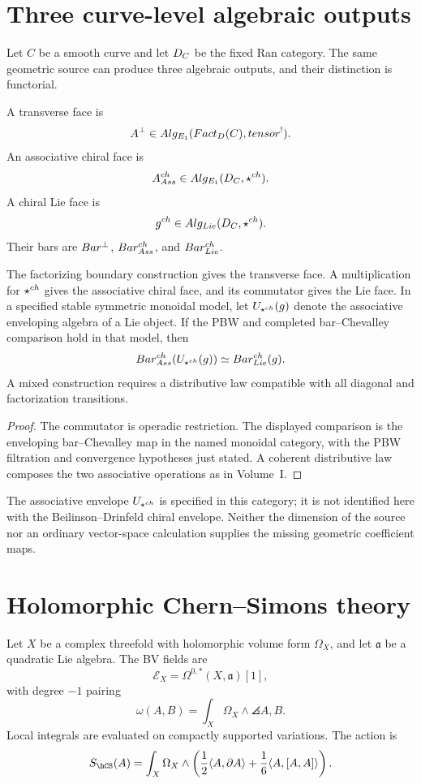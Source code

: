 \section{Three curve-level algebraic outputs}
Let $C$ be a smooth curve and let $D_C$ be the fixed Ran category.  The same geometric source can produce three algebraic outputs, and their distinction is functorial.

\begin{definition}
A transverse face is
\[
 A^\perp\in Alg_{E_1}(Fact_D(C),tensor^!).
\]
An associative chiral face is
\[
 A^{ch}_{Ass}\in Alg_{E_1}(D_C,\mathbin{\star^{ch}}).
\]
A chiral Lie face is
\[
 g^{ch}\in Alg_{Lie}(D_C,\mathbin{\star^{ch}}).
\]
Their bars are $Bar^{\perp}$, $Bar^{ch}_{Ass}$, and $Bar^{ch}_{Lie}$.
\end{definition}

\begin{theorem}
The factorizing boundary construction gives the transverse face.
A multiplication for $\mathbin{\star^{ch}}$ gives the associative chiral face, and
its commutator gives the Lie face. In a specified stable symmetric
monoidal model, let $U_{\mathbin{\star^{ch}}}(g)$ denote the associative enveloping
algebra of a Lie object. If the PBW and completed bar--Chevalley
comparison hold in that model, then
\[
 Bar^{ch}_{Ass}(U_{\mathbin{\star^{ch}}}(g))\simeq Bar^{ch}_{Lie}(g).
\]
A mixed construction requires a distributive law compatible with all
diagonal and factorization transitions.
\end{theorem}
\begin{proof}
The commutator is operadic restriction. The displayed comparison is
the enveloping bar--Chevalley map in the named monoidal category, with
the PBW filtration and convergence hypotheses just stated. A coherent
distributive law composes the two associative operations as in Volume~I.
\end{proof}

The associative envelope $U_{\mathbin{\star^{ch}}}$ is specified in this category;
it is not identified here with the Beilinson--Drinfeld chiral envelope.
Neither the dimension of the source nor an ordinary vector-space
calculation supplies the missing geometric coefficient maps.

\section{Holomorphic Chern--Simons theory}
Let $X$ be a complex threefold with holomorphic volume form $\Omega_X$, and let $\mathfrak a$ be a quadratic Lie algebra. The BV fields are
\[
 \mathcal E_X=\Omega^{0,*}(X,\mathfrak a)[1],
\]
with degree $-1$ pairing
\[
 \omega(A,B)=\int_X\Omega_X\wedge\angles{A,B}.
\]
Local integrals are evaluated on compactly supported variations. The action is
\[
 S_{\hCS}(A)=\int_X\Omega_X\wedge
 \left(\frac12\angles{A,\dbar A}+\frac16\angles{A,[A,A]}\right).
\]

